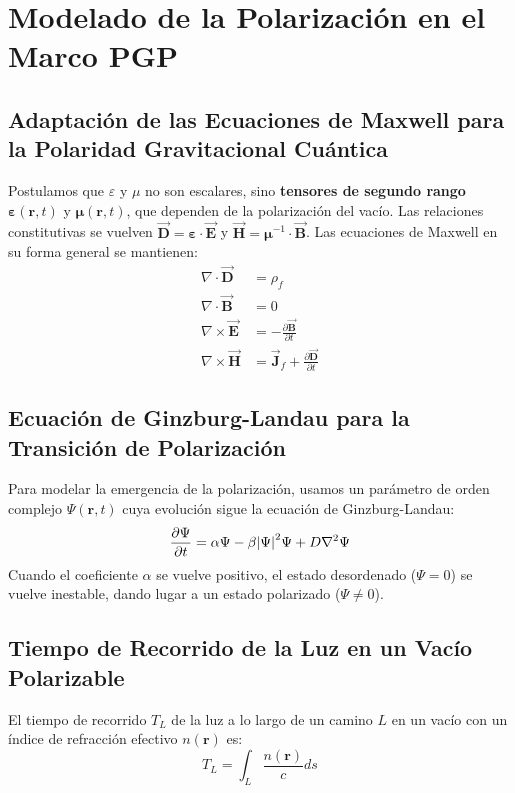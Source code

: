 \documentclass{book}
\newcommand{\bvec}[1]{\vec{\mathbf{#1}}} %
\begin{document}
\section{Modelado de la Polarización en el Marco PGP}

\subsection{Adaptación de las Ecuaciones de Maxwell para la Polaridad Gravitacional Cuántica}
\label{sec:maxwell_adapted}
Postulamos que $\varepsilon$ y $\mu$ no son escalares, sino \textbf{tensores de segundo rango} $\boldsymbol{\varepsilon}(\mathbf{r}, t)$ y $\boldsymbol{\mu}(\mathbf{r}, t)$, que dependen de la polarización del vacío. Las relaciones constitutivas se vuelven $\bvec{D} = \boldsymbol{\varepsilon} \cdot \bvec{E}$ y $\bvec{H} = \boldsymbol{\mu}^{-1} \cdot \bvec{B}$.
Las ecuaciones de Maxwell en su forma general se mantienen:
\begin{align}
   \nabla \cdot \bvec{D} &= \rho_f \label{eq:maxwell_gauss_E} \\
   \nabla \cdot \bvec{B} &= 0 \label{eq:maxwell_gauss_B} \\
   \nabla \times \bvec{E} &= - \frac{\partial \bvec{B}}{\partial t} \label{eq:maxwell_faraday} \\
   \nabla \times \bvec{H} &= \bvec{J}_f + \frac{\partial \bvec{D}}{\partial t} \label{eq:maxwell_ampere}
\end{align}

\subsection{Ecuación de Ginzburg-Landau para la Transición de Polarización}
\label{sec:ginzburg_landau}
Para modelar la emergencia de la polarización, usamos un parámetro de orden complejo $\Psi(\mathbf{r}, t)$ cuya evolución sigue la ecuación de Ginzburg-Landau:
\begin{equation}
    \pdv{\Psi}{t} = \alpha \Psi - \beta \abs{\Psi}^2 \Psi + D \nabla^2 \Psi
    \label{eq:ginzburg_landau}
\end{equation}
Cuando el coeficiente $\alpha$ se vuelve positivo, el estado desordenado ($\Psi=0$) se vuelve inestable, dando lugar a un estado polarizado ($\Psi \neq 0$).

\subsection{Tiempo de Recorrido de la Luz en un Vacío Polarizable}
\label{sec:light_travel_time}
El tiempo de recorrido $T_L$ de la luz a lo largo de un camino $L$ en un vacío con un índice de refracción efectivo $n(\mathbf{r})$ es:
\begin{equation}
    T_L = \int_{L} \frac{n(\mathbf{r})}{c} ds
    \label{eq:light_travel_time}
\end{equation}
\end{document}

